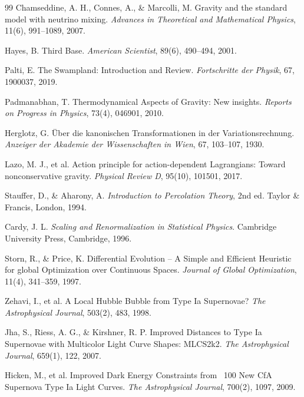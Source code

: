 \documentclass[12pt, a4paper]{article}
\theoremstyle{plain}
\theoremstyle{definition}
\begin{document}
\begin{thebibliography}{99}
Chamseddine, A. H., Connes, A., \& Marcolli, M.
\newblock Gravity and the standard model with neutrino mixing.
\newblock \textit{Advances in Theoretical and Mathematical Physics}, 11(6), 991–1089, 2007.

Hayes, B.
\newblock Third Base.
\newblock \textit{American Scientist}, 89(6), 490–494, 2001.

Palti, E.
\newblock The Swampland: Introduction and Review.
\newblock \textit{Fortschritte der Physik}, 67, 1900037, 2019.

Padmanabhan, T.
\newblock Thermodynamical Aspects of Gravity: New insights.
\newblock \textit{Reports on Progress in Physics}, 73(4), 046901, 2010.

Herglotz, G.
\newblock Über die kanonischen Transformationen in der Variationsrechnung.
\newblock \textit{Anzeiger der Akademie der Wissenschaften in Wien}, 67, 103–107, 1930.

Lazo, M. J., et al.
\newblock Action principle for action-dependent Lagrangians: Toward nonconservative gravity.
\newblock \textit{Physical Review D}, 95(10), 101501, 2017.

Stauffer, D., \& Aharony, A.
\newblock \textit{Introduction to Percolation Theory}, 2nd ed.
\newblock Taylor \& Francis, London, 1994.

Cardy, J. L.
\newblock \textit{Scaling and Renormalization in Statistical Physics}.
\newblock Cambridge University Press, Cambridge, 1996.

Storn, R., \& Price, K.
\newblock Differential Evolution – A Simple and Efficient Heuristic for global Optimization over Continuous Spaces.
\newblock \textit{Journal of Global Optimization}, 11(4), 341–359, 1997.

Zehavi, I., et al.
\newblock A Local Hubble Bubble from Type Ia Supernovae?
\newblock \textit{The Astrophysical Journal}, 503(2), 483, 1998.

Jha, S., Riess, A. G., \& Kirshner, R. P.
\newblock Improved Distances to Type Ia Supernovae with Multicolor Light Curve Shapes: MLCS2k2.
\newblock \textit{The Astrophysical Journal}, 659(1), 122, 2007.

Hicken, M., et al.
\newblock Improved Dark Energy Constraints from ~100 New CfA Supernova Type Ia Light Curves.
\newblock \textit{The Astrophysical Journal}, 700(2), 1097, 2009.


\end{thebibliography}
\end{document}
